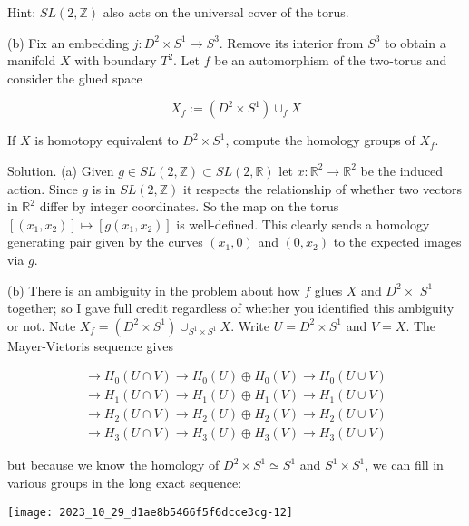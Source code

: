 \documentclass[10pt]{article}
\begin{document}
Hint: $S L(2, \mathbb{Z})$ also acts on the universal cover of the torus.

(b) Fix an embedding $j: D^{2} \times S^{1} \rightarrow S^{3}$. Remove its interior from $S^{3}$ to obtain a manifold $X$ with boundary $T^{2}$. Let $f$ be an automorphism of the two-torus and consider the glued space

$$
X_{f}:=\left(D^{2} \times S^{1}\right) \cup_{f} X
$$

If $X$ is homotopy equivalent to $D^{2} \times S^{1}$, compute the homology groups of $X_{f}$.

Solution. (a) Given $g \in S L(2, \mathbb{Z}) \subset S L(2, \mathbb{R})$ let $x: \mathbb{R}^{2} \rightarrow \mathbb{R}^{2}$ be the induced action. Since $g$ is in $S L(2, \mathbb{Z})$ it respects the relationship of whether two vectors in $\mathbb{R}^{2}$ differ by integer coordinates. So the map on the torus $\left[\left(x_{1}, x_{2}\right)\right] \mapsto\left[g\left(x_{1}, x_{2}\right)\right]$ is well-defined. This clearly sends a homology generating pair given by the curves $\left(x_{1}, 0\right)$ and $\left(0, x_{2}\right)$ to the expected images via $g$.

(b) There is an ambiguity in the problem about how $f$ glues $X$ and $D^{2} \times$ $S^{1}$ together; so I gave full credit regardless of whether you identified this ambiguity or not. Note $X_{f}=\left(D^{2} \times S^{1}\right) \cup_{S^{1} \times S^{1}} X$. Write $U=D^{2} \times S^{1}$ and $V=X$. The Mayer-Vietoris sequence gives

$$
\begin{array}{r}
\longrightarrow H_{0}(U \cap V) \longrightarrow H_{0}(U) \oplus H_{0}(V) \longrightarrow H_{0}(U \cup V) \\
\longrightarrow H_{1}(U \cap V) \longrightarrow H_{1}(U) \oplus H_{1}(V) \longrightarrow H_{1}(U \cup V) \\
\longrightarrow H_{2}(U \cap V) \longrightarrow H_{2}(U) \oplus H_{2}(V) \longrightarrow H_{2}(U \cup V) \\
\longrightarrow H_{3}(U \cap V) \longrightarrow H_{3}(U) \oplus H_{3}(V) \longrightarrow H_{3}(U \cup V)
\end{array}
$$

but because we know the homology of $D^{2} \times S^{1} \simeq S^{1}$ and $S^{1} \times S^{1}$, we can fill in various groups in the long exact sequence:

\begin{center}
\texttt{[image: 2023\_10\_29\_d1ae8b5466f5f6dcce3cg-12]}
\end{center}
\end{document}
